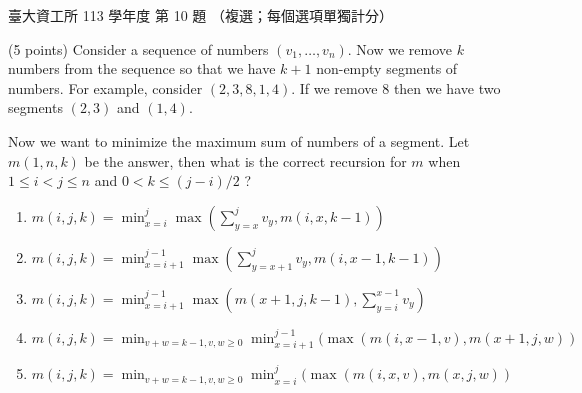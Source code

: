 \begin{pastexam}[label={px:ntu-113-dsa-10}]{臺大資工所 113 學年度 第 10 題}
（複選；每個選項單獨計分）

(5 points) Consider a sequence of numbers $(v_1,\ldots,v_n)$. Now we remove $k$ numbers from the
sequence so that we have $k+1$ non-empty segments of numbers. For example, consider $(2,3,8,1,4)$. If
we remove 8 then we have two segments $(2,3)$ and $(1,4)$.

Now we want to minimize the maximum sum of numbers of a segment. Let $m(1,n,k)$ be the answer, then
what is the correct recursion for $m$ when $1\le i<j\le n$ and $0<k\le(j-i)/2$ ?
\begin{enumerate}[label=\Alph*.]
\item $m(i,j,k)=\min_{x=i}^{j}\max(\sum_{y=x}^{j}v_y,m(i,x,k-1))$
\item $m(i,j,k)=\min_{x=i+1}^{j-1}\max(\sum_{y=x+1}^{j}v_y,m(i,x-1,k-1))$
\item $m(i,j,k)=\min_{x=i+1}^{j-1}\max(m(x+1,j,k-1),\sum_{y=i}^{x-1}v_y)$
\item $m(i,j,k)=\min_{v+w=k-1,v,w\ge0}\min_{x=i+1}^{j-1}(\max(m(i,x-1,v),m(x+1,j,w))$
\item $m(i,j,k)=\min_{v+w=k-1,v,w\ge0}\min_{x=i}^{j}(\max(m(i,x,v),m(x,j,w))$
\end{enumerate}
\end{pastexam}

